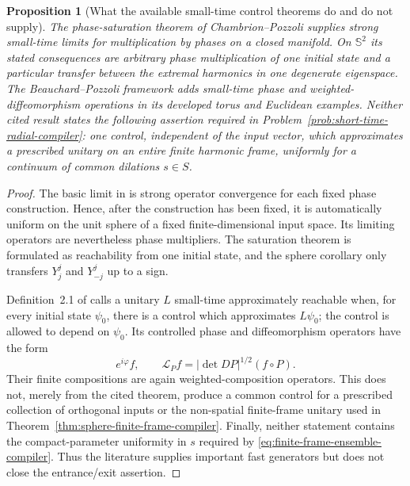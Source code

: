 \documentclass[11pt]{article}
\newtheorem{proposition}[theorem]{Proposition}
\theoremstyle{remark}
\begin{document}
\begin{proposition}[What the available small-time control theorems do and do
not supply]
\label{prop:small-time-literature-audit}
The phase-saturation theorem of Chambrion--Pozzoli
\cite{ChambrionPozzoli2023} supplies strong small-time limits for
multiplication by phases on a closed manifold.  On $\mathbb S^2$ its stated
consequences are arbitrary phase multiplication of one initial state and a
particular transfer between the extremal harmonics in one degenerate
eigenspace.  The Beauchard--Pozzoli framework
\cite{BeauchardPozzoli2025} adds small-time phase and weighted-diffeomorphism
operations in its developed torus and Euclidean examples.  Neither cited
result states the following assertion required in
Problem~\ref{prob:short-time-radial-compiler}: one control, independent of the
input vector, which approximates a prescribed unitary on an entire finite
harmonic frame, uniformly for a continuum of common dilations $s\in S$.
\end{proposition}

\begin{proof}
The basic limit in \cite[Theorem~2]{ChambrionPozzoli2023} is strong operator
convergence for each fixed phase construction.  Hence, after the construction
has been fixed, it is automatically uniform on the unit sphere of a fixed
finite-dimensional input space.  Its limiting operators are nevertheless
phase multipliers.  The saturation theorem
\cite[Theorem~6]{ChambrionPozzoli2023} is formulated as reachability from one
initial state, and the sphere corollary
\cite[Corollary~4]{ChambrionPozzoli2023} only transfers
$Y^j_j$ and $Y^j_{-j}$ up to a sign.

Definition~2.1 of \cite{BeauchardPozzoli2025} calls a unitary $L$
small-time approximately reachable when, for every initial state $\psi_0$,
there is a control which approximates $L\psi_0$; the control is allowed to
depend on $\psi_0$.  Its controlled phase and diffeomorphism operators have
the form
\[
 e^{i\varphi}f,\qquad
 \mathcal L_Pf=|\det DP|^{1/2}(f\circ P).
\]
Their finite compositions are again weighted-composition operators.  This
does not, merely from the cited theorem, produce a common control for a
prescribed collection of orthogonal inputs or the non-spatial
finite-frame unitary used in
Theorem~\ref{thm:sphere-finite-frame-compiler}.  Finally, neither statement
contains the compact-parameter uniformity in $s$ required by
\eqref{eq:finite-frame-ensemble-compiler}.  Thus the literature supplies
important fast generators but does not close the entrance/exit assertion.
\end{proof}
\end{document}
